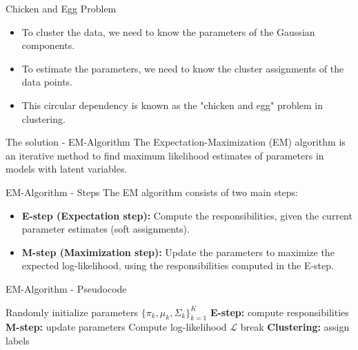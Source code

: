 \begin{frame}{Chicken and Egg Problem}
    \centering
    \begin{itemize}
        \item To cluster the data, we need to know the parameters of the Gaussian components.
        \item To estimate the parameters, we need to know the cluster assignments of the data points.
        \item This circular dependency is known as the "chicken and egg" problem in clustering.
    \end{itemize}
\end{frame}

\begin{frame}{The solution - EM-Algorithm}
    \centering
    The Expectation-Maximization (EM) algorithm is an iterative method to find maximum likelihood estimates of parameters in models with latent variables.
\end{frame}

\begin{frame}{EM-Algorithm - Steps}
    \centering
    The EM algorithm consists of two main steps:
    \vfill
    \begin{itemize}
        \item \textbf{E-step (Expectation step):} Compute the responsibilities, given the current parameter estimates (soft assignments).
        \item \textbf{M-step (Maximization step):} Update the parameters to maximize the expected log-likelihood, using the responsibilities
        computed in the E-step.
    \end{itemize}
\end{frame}

\begin{frame}{EM-Algorithm - Pseudocode}
    \begin{algorithm}[H]
    \caption{Expectation-Maximization for GMM clustering}
    \begin{algorithmic}[1]
    \State Randomly initialize parameters $\{\pi_k, \mu_k, \Sigma_k\}_{k=1}^K$
        \State \textbf{E-step:} compute responsibilities 
        \State \textbf{M-step:} update parameters 
        \State Compute log-likelihood $\mathcal{L}$ 
            \State break 
        \EndIf
    \EndFor
    \State \textbf{Clustering:} assign labels 
    \end{algorithmic}
    \label{em_alg}
    \end{algorithm}
\end{frame}

